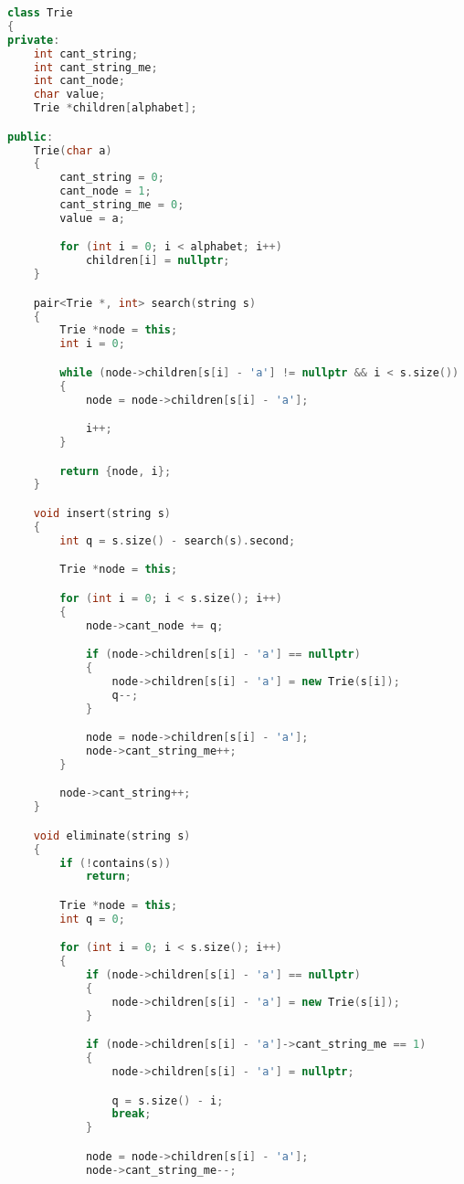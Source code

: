 \documentclass[leter]{amsart}
\begin{document}
\begin{multicols}{2}
\begin{lstlisting}[language=C++]
class Trie
{
private:
    int cant_string;
    int cant_string_me;
    int cant_node;
    char value;
    Trie *children[alphabet];

public:
    Trie(char a)
    {
        cant_string = 0;
        cant_node = 1;
        cant_string_me = 0;
        value = a;

        for (int i = 0; i < alphabet; i++)
            children[i] = nullptr;
    }

    pair<Trie *, int> search(string s)
    {
        Trie *node = this;
        int i = 0;

        while (node->children[s[i] - 'a'] != nullptr && i < s.size())
        {
            node = node->children[s[i] - 'a'];

            i++;
        }

        return {node, i};
    }

    void insert(string s)
    {
        int q = s.size() - search(s).second;

        Trie *node = this;

        for (int i = 0; i < s.size(); i++)
        {
            node->cant_node += q;

            if (node->children[s[i] - 'a'] == nullptr)
            {
                node->children[s[i] - 'a'] = new Trie(s[i]);
                q--;
            }

            node = node->children[s[i] - 'a'];
            node->cant_string_me++;
        }

        node->cant_string++;
    }

    void eliminate(string s)
    {
        if (!contains(s))
            return;

        Trie *node = this;
        int q = 0;

        for (int i = 0; i < s.size(); i++)
        {
            if (node->children[s[i] - 'a'] == nullptr)
            {
                node->children[s[i] - 'a'] = new Trie(s[i]);
            }

            if (node->children[s[i] - 'a']->cant_string_me == 1)
            {
                node->children[s[i] - 'a'] = nullptr;

                q = s.size() - i;
                break;
            }

            node = node->children[s[i] - 'a'];
            node->cant_string_me--;


\end{lstlisting}
\end{multicols}
\end{document}
